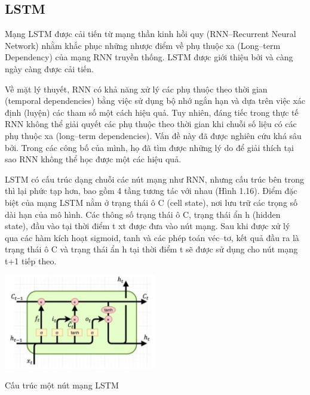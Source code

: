 \subsection{LSTM}

Mạng LSTM được cải tiến từ mạng thần kinh hồi quy (RNN–Recurrent Neural 
Network) nhằm khắc phục những nhược điểm về phụ thuộc xa (Long–term Dependency) của mạng RNN truyền thống. LSTM được giới thiệu bởi và càng ngày càng được cải tiến.

Về mặt lý thuyết, RNN có khả năng xử lý các phụ thuộc theo thời gian (temporal dependencies) bằng việc sử dụng bộ nhớ ngắn hạn và dựa trên việc xác định (luyện) các tham số một cách hiệu quả. Tuy nhiên, đáng tiếc trong thực tế RNN không thể giải quyết các phụ thuộc theo thời gian khi chuỗi số liệu có các phụ thuộc xa (long–term dependencies). Vấn đề này đã được nghiên cứu khá sâu bởi. Trong các công bố của mình, họ đã tìm được những lý do để giải thích tại sao RNN không thể học được một các hiệu quả.

LSTM có cấu trúc dạng chuỗi các nút mạng như RNN, nhưng cấu trúc bên trong thì lại phức tạp hơn, bao gồm 4 tầng tương tác với nhau (Hình 1.16). Điểm đặc biệt của mạng LSTM nằm ở trạng thái ô C (cell state), nơi lưu trữ các trọng số dài hạn của mô hình. Các thông số trạng thái ô C, trạng thái ẩn h (hidden state), đầu vào tại thời điểm t xt được đưa vào nút mạng. Sau khi được xử lý qua các hàm kích hoạt sigmoid, tanh và các phép toán véc–tơ, kết quả đầu ra là trạng thái ô C và trạng thái ẩn h tại thời điểm t sẽ được sử dụng cho nút mạng t+1 tiếp theo\cite{lstm}.

\begin{minipage}{\linewidth}
    \captionsetup{type=figure}
    \centering
    \includegraphics[width=0.5\textwidth]{images/lstm.png}
    \caption{Cấu trúc một nút mạng LSTM}
\end{minipage}




